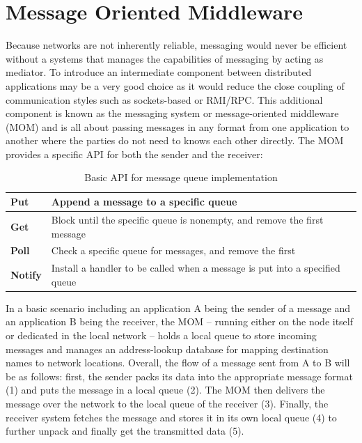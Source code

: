 \newpage

\section{Message Oriented Middleware}
\label{intro-messaging-mom}

Because networks are not inherently reliable, messaging would never be
efficient without a systems that manages the capabilities of messaging by acting
as mediator. To introduce an intermediate component between distributed
applications may be a very good choice as it would reduce the close coupling of
communication styles such as sockets-based or RMI/RPC. This additional component
is known as the messaging system or message-oriented middleware (MOM) and is
all about passing messages in any format from one application to another where
the parties do not need to knows each other directly. \cite{TAN06} The MOM
provides a specific API for both the sender and the receiver:

\begin{table}[H]
\centering
\begin{tabular}{|l|l|}
\hline
\textbf{Put}    & Append a message to a specific queue                                        \\ \hline
\textbf{Get}    & Block until the specific queue is nonempty, and remove the first message    \\ \hline
\textbf{Poll}   & Check a specific queue for messages, and remove the first                   \\ \hline
\textbf{Notify} & Install a handler to be called when a message is put into a specified queue \\ \hline
\end{tabular}
\caption{Basic API for message queue implementation \cite{TAN06}}
\end{table}

In a basic scenario including an application A being the sender of a message and
an application B being the receiver, the MOM -- running either on the node itself
or dedicated in the local network -- holds a local queue to store incoming
messages and manages an address-lookup database for mapping destination names to
network locations. Overall, the flow of a message sent from A to B will be as
follows: first, the sender packs its data into the appropriate message format
(1) and puts the message in a local queue (2). The MOM then delivers the message
over the network to the local queue of the receiver (3). Finally, the receiver
system fetches the message and stores it in its own local queue (4) to
further unpack and finally get the transmitted data (5).

